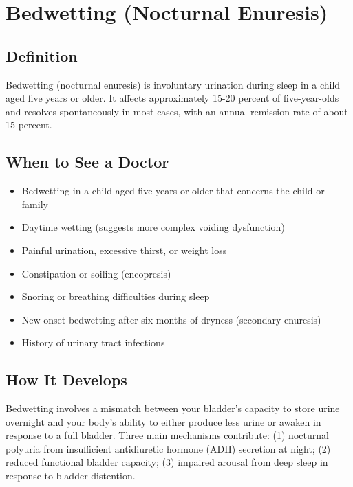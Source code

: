 \chapter{Bedwetting (Nocturnal Enuresis)}

\section*{Definition}
Bedwetting (nocturnal enuresis) is involuntary urination during sleep in a child aged five years or older. It affects approximately 15-20 percent of five-year-olds and resolves spontaneously in most cases, with an annual remission rate of about 15 percent.

\section*{When to See a Doctor}
\begin{itemize}
\item Bedwetting in a child aged five years or older that concerns the child or family
\item Daytime wetting (suggests more complex voiding dysfunction)
\item Painful urination, excessive thirst, or weight loss
\item Constipation or soiling (encopresis)
\item Snoring or breathing difficulties during sleep
\item New-onset bedwetting after six months of dryness (secondary enuresis)
\item History of urinary tract infections
\end{itemize}

\section*{How It Develops}
Bedwetting involves a mismatch between your bladder's capacity to store urine overnight and your body's ability to either produce less urine or awaken in response to a full bladder. Three main mechanisms contribute: (1) nocturnal polyuria from insufficient antidiuretic hormone (ADH) secretion at night; (2) reduced functional bladder capacity; (3) impaired arousal from deep sleep in response to bladder distention.

